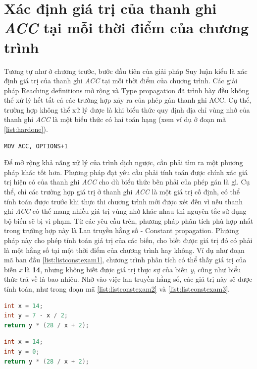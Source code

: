 \section{Xác định giá trị của thanh ghi \textit{ACC} tại mỗi thời điểm của chương trình}
Tương tự như ở chương trước, bước đầu tiên của giải pháp Suy luận kiểu là xác định giá trị của thanh ghi \textit{ACC} tại mỗi thời điểm của chương trình. Các giải pháp Reaching definitions mở rộng và Type propagation đã trình bày đều không thể xử lý hết tất cả các trường hợp xảy ra của phép gán thanh ghi ACC. Cụ thể, trường hợp không thể xử lý được là khi biểu thức quy định địa chỉ vùng nhớ của thanh ghi \textit{ACC} là một biểu thức có hai toán hạng (xem ví dụ ở đoạn mã \ref{list:hardone}). 
\begin{lstlisting}[caption={Trường hợp không thể xử lý được bằng các phương pháp phân tích dữ liệu trước},label={list:hardone}]
MOV ACC, OPTIONS+1
\end{lstlisting}
Để mở rộng khả năng xử lý của trình dịch ngược, cần phải tìm ra một phương pháp khác tốt hơn. Phương pháp đạt yêu cầu phải tính toán được chính xác giá trị hiện có của thanh ghi \textit{ACC} cho dù biểu thức bên phải của phép gán là gì. Cụ thể, chỉ các trường hợp giá trị ở thanh ghi \textit{ACC} là một giá trị cố định, có thể tính toán được trước khi thực thi chương trình mới được xét đến vì nếu thanh ghi \textit{ACC} có thể mang nhiều giá trị vùng nhớ khác nhau thì nguyên tắc sử dụng bộ biến sẽ bị vi phạm. Từ các yêu cầu trên, phương pháp phân tích phù hợp nhất trong trường hợp này là Lan truyền hằng số - Constant propagation. Phương pháp này cho phép tính toán giá trị của các biến, cho biết được giá trị đó có phải là một hằng số tại một thời điểm của chương trình hay không. Ví dụ như đoạn mã ban đầu \ref{list:listconstexam1}, chương trình phân tích có thể thấy giá trị của biến \textit{x} là \textbf{14}, nhưng không biết được giá trị thực sự của biến \textit{y}, cũng như biểu thức trả về là bao nhiêu. Nhờ vào việc lan truyền hằng số, các giá trị này sẽ được tính toán, như trong đoạn mã \ref{list:listconstexam2} và \ref{list:listconstexam3}.
\begin{lstlisting}[caption={Đoạn mã trước khi thực hiện lan truyền hằng số},label={list:listconstexam1}, language=c++]
 int x = 14;
int y = 7 - x / 2;
return y * (28 / x + 2);
\end{lstlisting}
\begin{lstlisting}[caption={Đoạn mã sau khi thực hiện lan truyền hằng số cho biến y},label={list:listconstexam2}, language=c++]
int x = 14;
int y = 0;
return y * (28 / x + 2);
\end{lstlisting}
